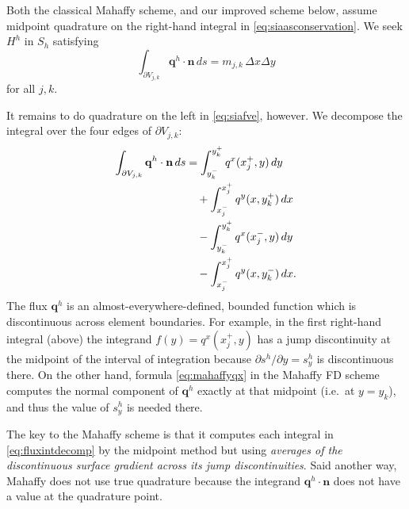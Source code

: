 \documentclass[twocolumn,letterpaper]{igs}
\newcommand\bn{\mathbf{n}}
\newcommand\bq{\mathbf{q}}
\begin{document}
Both the classical Mahaffy scheme, and our improved scheme below, assume midpoint quadrature on the right-hand integral in \eqref{eq:siaasconservation}.  We seek $H^h$ in $S_h$ satisfying
\begin{equation}
  \int_{\partial V_{j,k}} \bq^h \cdot \bn\,ds = m_{j,k}\, \Delta x \Delta y \label{eq:siafve}
\end{equation}
for all $j,k$.

It remains to do quadrature on the left in \eqref{eq:siafve}, however.  We decompose the integral over the four edges of $\partial V_{j,k}$:
\begin{align}
\int_{\partial V_{j,k}} \bq^h \cdot \bn\,ds &= \int_{y_k^-}^{y_k^+} q^x(x_j^+,y)\,dy \label{eq:fluxintdecomp} \\
&\quad + \int_{x_j^-}^{x_j^+} q^y(x,y_k^+)\,dx \notag \\
&\quad - \int_{y_k^-}^{y_k^+} q^x(x_j^-,y)\,dy \notag \\
&\quad - \int_{x_j^-}^{x_j^+} q^y(x,y_k^-)\,dx. \notag
\end{align}
The flux $\bq^h$ is an almost-everywhere-defined, bounded function which is discontinuous across element boundaries.  For example, in the first right-hand integral (above) the integrand $f(y) = q^x(x_j^+,y)$ has a jump discontinuity at the midpoint of the interval of integration because $\partial s^h/\partial y = s^h_y$ is discontinuous there.  On the other hand, formula \eqref{eq:mahaffyqx} in the Mahaffy FD scheme computes the normal component of $\bq^h$ exactly at that midpoint (i.e.~at $y=y_k$), and thus the value of $s^h_y$ is needed there.

The key to the Mahaffy scheme is that it computes each integral in \eqref{eq:fluxintdecomp} by the midpoint method but using \emph{averages of the discontinuous surface gradient across its jump discontinuities}.  Said another way, Mahaffy does not use true quadrature because the integrand $\bq^h\cdot \bn$ does not have a value at the quadrature point.
\end{document}
